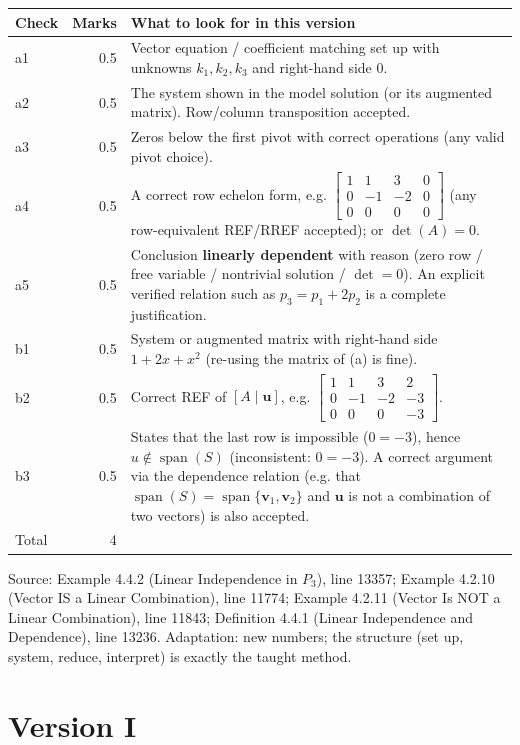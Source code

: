 \documentclass[11pt,a4paper]{article}
\newcommand{\Src}[1]{{\footnotesize\color{black!65}Source: #1}}
\begin{document}
\begin{tabularx}{\linewidth}{@{}l r X@{}}\toprule Check & Marks & What to look for in this version\\\midrule
a1 & 0.5 & Vector equation / coefficient matching set up with unknowns $k_1,k_2,k_3$ and right-hand side $0$.\\
a2 & 0.5 & The system shown in the model solution (or its augmented matrix). Row/column transposition accepted.\\
a3 & 0.5 & Zeros below the first pivot with correct operations (any valid pivot choice).\\
a4 & 0.5 & A correct row echelon form, e.g. $\left[\begin{array}{ccc|c} 1 & 1 & 3 & 0 \\ 0 & -1 & -2 & 0 \\ 0 & 0 & 0 & 0 \end{array}\right]$ (any row-equivalent REF/RREF accepted); or $\det(A)=0$.\\
a5 & 0.5 & Conclusion \textbf{linearly dependent} with reason (zero row / free variable / nontrivial solution / $\det=0$). An explicit verified relation such as $p_3=p_1+2p_2$ is a complete justification.\\
b1 & 0.5 & System or augmented matrix with right-hand side $1+2x+x^{2}$ (re-using the matrix of (a) is fine).\\
b2 & 0.5 & Correct REF of $[A\mid\mathbf{u}]$, e.g. $\left[\begin{array}{ccc|c} 1 & 1 & 3 & 2 \\ 0 & -1 & -2 & -3 \\ 0 & 0 & 0 & -3 \end{array}\right]$.\\
b3 & 0.5 & States that the last row is impossible ($0=-3$), hence $u\notin\operatorname{span}(S)$ (inconsistent: $0=-3$). A correct argument via the dependence relation (e.g. that $\operatorname{span}(S)=\operatorname{span}\{\mathbf{v}_1,\mathbf{v}_2\}$ and $\mathbf{u}$ is not a combination of two vectors) is also accepted.\\
\midrule Total & 4 & \\\bottomrule\end{tabularx}
\Src{Example 4.4.2 (Linear Independence in $P_3$), line 13357; Example 4.2.10 (Vector IS a Linear Combination), line 11774; Example 4.2.11 (Vector Is NOT a Linear Combination), line 11843; Definition 4.4.1 (Linear Independence and Dependence), line 13236. Adaptation: new numbers; the structure (set up, system, reduce, interpret) is exactly the taught method.}\par
\clearpage\section*{Version I}
\end{document}
